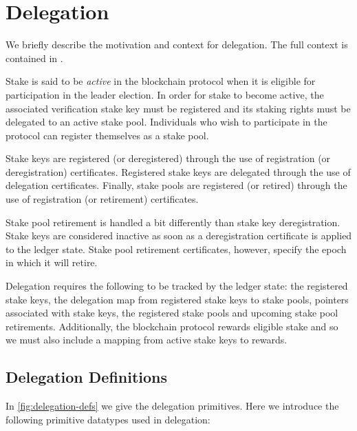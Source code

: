 \section{Delegation}
\label{sec:delegation-shelley}

We briefly describe the motivation and context for delegation.
The full context is contained in \cite{delegation_design}.

Stake is said to be \textit{active} in the blockchain protocol
when it is eligible for participation in the leader election. In order for
stake to become active,
the associated verification stake key must be registered
and its staking rights must be delegated to an active stake pool.
Individuals who wish to participate in the protocol can
register themselves as a stake pool.

Stake keys are registered (or deregistered) through the use of
registration (or deregistration) certificates.
Registered stake keys are delegated through the use of delegation certificates.
Finally, stake pools are registered (or retired) through the use of
registration (or retirement) certificates.

Stake pool retirement is handled a bit differently than stake key deregistration.
Stake keys are considered inactive as soon as a deregistration certificate
is applied to the ledger state.
Stake pool retirement certificates, however, specify the epoch in
which it will retire.

Delegation requires the following to be tracked by the ledger state:
the registered stake keys, the delegation map from registered stake keys to stake
pools, pointers associated with stake keys,
the registered stake pools and upcoming stake pool retirements.
Additionally, the blockchain protocol rewards eligible stake and so we must
also include a mapping from active stake keys to rewards.

\subsection{Delegation Definitions}
\label{sec:deleg-defs}

In \cref{fig:delegation-defs} we give the delegation primitives.
Here we introduce the following primitive datatypes used in delegation:

